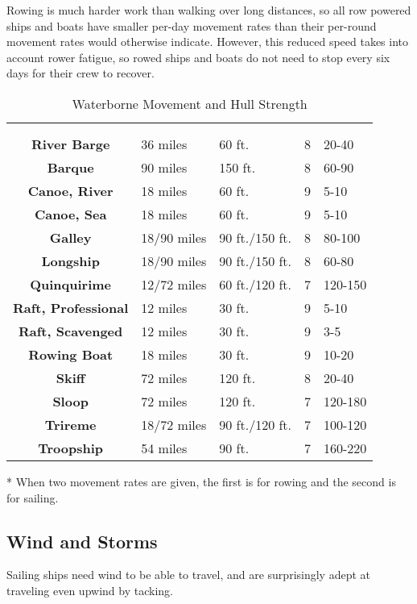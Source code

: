 \begin{multicols*}{2}
Rowing is much harder work than walking over long distances, so all row powered ships and boats have smaller per-day movement rates than their per-round movement rates would otherwise indicate. However, this reduced speed takes into account rower fatigue, so rowed ships and boats do not need to stop every six days for their crew to recover.

\begin {table}[H]
  \caption{Waterborne Movement and Hull Strength}\label{tab:Waterborne Movement and Hull Strength}
  \begin{tabularx}{\columnwidth}{>{\bfseries}cYYcY}
	\thead{} &  & \thead{} & \thead{}\\
	 &  &  &  & \\
	River Barge & 36 miles & 60 ft. & 8 & 20-40\\
	Barque & 90 miles & 150 ft. & 8 & 60-90\\
	Canoe, River & 18 miles & 60 ft. & 9 & 5-10\\
	Canoe, Sea & 18 miles & 60 ft. & 9 & 5-10\\
	Galley & 18/90 miles & 90 ft./150 ft. & 8 & 80-100\\
	Longship & 18/90 miles & 90 ft./150 ft. & 8 & 60-80\\
	Quinquirime & 12/72 miles & 60 ft./120 ft. & 7 & 120-150\\
	Raft, Professional & 12 miles & 30 ft. & 9 & 5-10\\
	Raft, Scavenged & 12 miles & 30 ft. & 9 & 3-5\\
	Rowing Boat & 18 miles & 30 ft. & 9 & 10-20\\
	Skiff & 72 miles & 120 ft. & 8 & 20-40\\
	Sloop & 72 miles & 120 ft. & 7 & 120-180\\
	Trireme & 18/72 miles & 90 ft./120 ft. & 7 & 100-120\\
	Troopship & 54 miles & 90 ft. & 7 & 160-220
	\end {tabularx}
	* When two movement rates are given, the first is for rowing and the second is for sailing.
\end {table}

\subsection{Wind and Storms}
Sailing ships need wind to be able to travel, and are surprisingly adept at traveling even upwind by tacking.


\end{multicols*}
